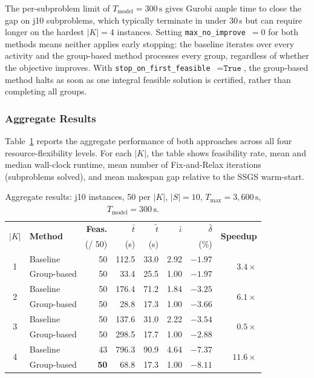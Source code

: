 \noindent
The per-subproblem limit of $T_{\mathrm{model}}=300\,\text{s}$
gives Gurobi ample time to close the gap on j10 subproblems,
which typically terminate in under 30\,s but can require
longer on the hardest $|K|=4$ instances. Setting
\texttt{max\_no\_improve}~$=0$ for both methods means neither
applies early stopping: the baseline iterates over every
activity and the group-based method processes every group,
regardless of whether the objective improves. With
\texttt{stop\_on\_first\_feasible}~$=\texttt{True}$, the
group-based method halts as soon as one integral feasible
solution is certified, rather than completing all groups.
\subsubsection*{Aggregate Results}
Table~\ref{tab:j10_summary} reports the aggregate performance
of both approaches across all four resource-flexibility levels.
For each $|K|$, the table shows feasibility rate, mean and
median wall-clock runtime, mean number of Fix-and-Relax
iterations (subproblems solved), and mean makespan gap relative
to the SSGS warm-start.
\begin{table}[htbp]
\centering
\renewcommand{\arraystretch}{1.35}
\caption{Aggregate results: j10 instances, 50 per $|K|$,
         $|S|=10$, $T_{\max}=3{,}600\,\text{s}$,
         $T_{\mathrm{model}}=300\,\text{s}$.}
\label{tab:j10_summary}
\begin{tabular}{c l r r r r r r}
\hline
\multirow{2}{*}{$|K|$} &
\multirow{2}{*}{\textbf{Method}} &
\textbf{Feas.} &
$\bar{t}$ &
$\tilde{t}$ &
$\bar{\iota}$ &
$\bar{\delta}$ &
\multirow{2}{*}{\textbf{Speedup}} \\
& & (/ 50) & (s) & (s) & & (\%) & \\
\hline
\multirow{2}{*}{1}
  & Baseline    & 50 & 112.5 & 33.0 & 2.92 & $-1.97$ & \multirow{2}{*}{$3.4\times$} \\
  & Group-based & 50 &  33.4 & 25.5 & 1.00 & $-1.97$ & \\
\hline
\multirow{2}{*}{2}
  & Baseline    & 50 & 176.4 & 71.2 & 1.84 & $-3.25$ & \multirow{2}{*}{$6.1\times$} \\
  & Group-based & 50 &  28.8 & 17.3 & 1.00 & $-3.66$ & \\
\hline
\multirow{2}{*}{3}
  & Baseline    & 50 & 137.6 & 31.0 & 2.22 & $-3.54$ & \multirow{2}{*}{$0.5\times$} \\
  & Group-based & 50 & 298.5 & 17.7 & 1.00 & $-2.88$ & \\
\hline
\multirow{2}{*}{4}
  & Baseline    & 43 & 796.3 & 90.9 & 4.64 & $-7.37$ & \multirow{2}{*}{$11.6\times$} \\
  & Group-based & \textbf{50} &  68.8 & 17.3 & 1.00 & $-8.11$ & \\
\hline
\end{tabular}
\end{table}
